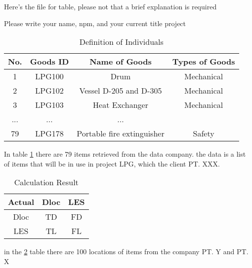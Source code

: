 Here's the file for table, please not that a brief explanation is required

Please write your name, npm, and your current title project

\begin{table}[h]
    \caption{Definition of Individuals}
    \centering
    \begin{tabular}{c c c c}
    \hline
    No. & Goods ID & Name of Goods & Types of Goods \\
    \hline
    1 & LPG100 & Drum & Mechanical \\
    2 & LPG102 & Vessel D-205 and D-305 & Mechanical \\
    3 & LPG103 & Heat Exchanger & Mechanical\\
    ... & ... & ... \\
    79 & LPG178 & Portable fire extinguisher & Safety \\
    \hline
    \end{tabular}
    \label{table}
\end{table}

\par In table \ref{table} there are 79 items retrieved from the data company. the data is a list of items that will be in use in project LPG, which the client PT. XXX.

\begin{table}[h]
    \centering
    \begin{tabular}{ccc}
    \hline
        Actual & Dloc & LES  \\
    \hline
         Dloc & TD & FD \\
         LES & TL & FL \\
    \hline
    \end{tabular}
    \caption{Calculation Result}
    \label{table1}
\end{table}

\par
in the \ref{table1} table there are 100 locations of items from the company PT. Y and PT. X
